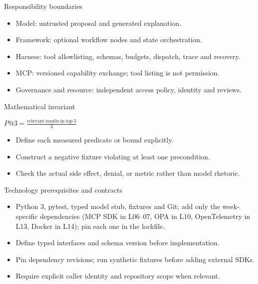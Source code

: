\documentclass[aspectratio=169,10pt]{beamer}
\begin{document}
\begin{frame}{Responsibility boundaries}
\small
\begin{itemize}
\item Model: untrusted proposal and generated explanation.
\item Framework: optional workflow nodes and state orchestration.
\item Harness: tool allowlisting, schemas, budgets, dispatch, trace and recovery.
\item MCP: versioned capability exchange; tool listing is not permission.
\item Governance and resource: independent access policy, identity and reviews.
\end{itemize}

\end{frame}

\begin{frame}{Mathematical invariant}
\small
\begin{center}\Large $P@3=\frac{\mathrm{relevant\ results\ in\ top\ 3}}{3}$\end{center}
\begin{itemize}
\item Define each measured predicate or bound explicitly.
\item Construct a negative fixture violating at least one precondition.
\item Check the actual side effect, denial, or metric rather than model rhetoric.
\end{itemize}

\end{frame}

\begin{frame}{Technology prerequisites and contracts}
\small
\begin{itemize}
\item Python 3, pytest, typed model stub, fixtures and Git; add only the week-specific dependencies (MCP SDK in L06--07, OPA in L10, OpenTelemetry in L13, Docker in L14); pin each one in the lockfile.
\item Define typed interfaces and schema version before implementation.
\item Pin dependency revisions; run synthetic fixtures before adding external SDKs.
\item Require explicit caller identity and repository scope when relevant.
\end{itemize}

\end{frame}
\end{document}
